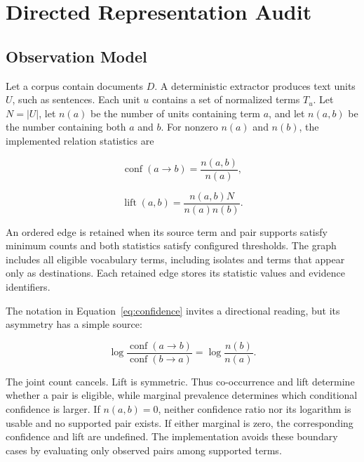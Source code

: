 \documentclass[manuscript,screen,review,anonymous]{acmart}
\begin{document}
\section{Directed Representation Audit}

\subsection{Observation Model}

Let a corpus contain documents $D$. A deterministic extractor produces text units $U$, such as sentences. Each unit $u$ contains a set of normalized terms $T_u$. Let $N=|U|$, let $n(a)$ be the number of units containing term $a$, and let $n(a,b)$ be the number containing both $a$ and $b$. For nonzero $n(a)$ and $n(b)$, the implemented relation statistics are

\begin{equation}
\operatorname{conf}(a\rightarrow b)=\frac{n(a,b)}{n(a)},
\label{eq:confidence}
\end{equation}

\begin{equation}
\operatorname{lift}(a,b)=\frac{n(a,b)N}{n(a)n(b)}.
\label{eq:lift}
\end{equation}

An ordered edge is retained when its source term and pair supports satisfy minimum counts and both statistics satisfy configured thresholds. The graph includes all eligible vocabulary terms, including isolates and terms that appear only as destinations. Each retained edge stores its statistic values and evidence identifiers.

The notation in Equation~\ref{eq:confidence} invites a directional reading, but its asymmetry has a simple source:

\begin{equation}
\log\frac{\operatorname{conf}(a\rightarrow b)}{\operatorname{conf}(b\rightarrow a)}
=\log\frac{n(b)}{n(a)}.
\label{eq:identity}
\end{equation}

The joint count cancels. Lift is symmetric. Thus co-occurrence and lift determine whether a pair is eligible, while marginal prevalence determines which conditional confidence is larger. If $n(a,b)=0$, neither confidence ratio nor its logarithm is usable and no supported pair exists. If either marginal is zero, the corresponding confidence and lift are undefined. The implementation avoids these boundary cases by evaluating only observed pairs among supported terms.
\end{document}
